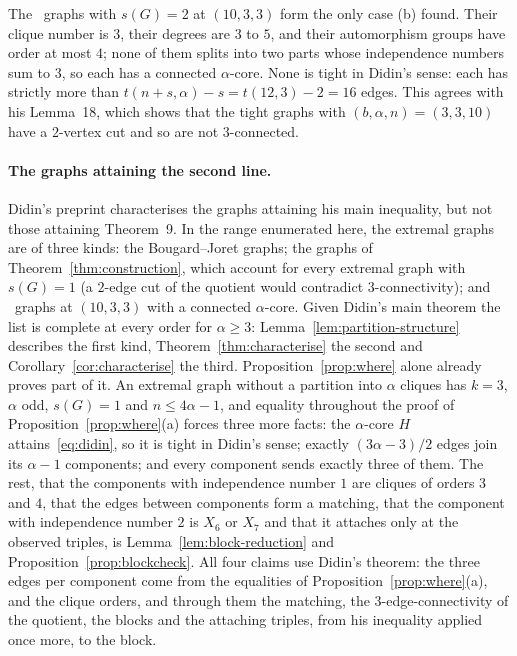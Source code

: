 \documentclass[11pt]{article}
\theoremstyle{definition}
\theoremstyle{remark}
\begin{document}
The \ntenthreeb\ graphs with $s(G)=2$ at $(10,3,3)$ form the only case (b) found. Their clique number is $3$, their
degrees are $3$ to $5$, and their automorphism groups have order at most $4$; none of them splits into two parts whose
independence numbers sum to $3$, so each has a connected $\alpha$-core. None is tight in Didin's sense: each has
strictly more than $t(n+s,\alpha)-s=t(12,3)-2=16$ edges. This agrees with his Lemma~18, which shows that the tight
graphs with $(b,\alpha,n)=(3,3,10)$ have a $2$-vertex cut and so are not $3$-connected.

\paragraph{The graphs attaining the second line.} Didin's preprint characterises the graphs attaining his main
inequality, but not those attaining Theorem~9. In the range enumerated here, the extremal graphs are of three kinds:
the Bougard--Joret graphs; the graphs of Theorem~\ref{thm:construction}, which account for every extremal graph with
$s(G)=1$ (a $2$-edge cut of the quotient would contradict $3$-connectivity); and \ntenthreeb\ graphs at $(10,3,3)$
with a connected $\alpha$-core. Given Didin's main theorem the list is complete at every order for $\alpha\ge3$: Lemma~\ref{lem:partition-structure} describes
the first kind, Theorem~\ref{thm:characterise} the second and Corollary~\ref{cor:characterise} the third.
Proposition~\ref{prop:where} alone already proves part of it. An extremal graph without a partition into
$\alpha$ cliques has $k=3$, $\alpha$ odd, $s(G)=1$ and $n\le4\alpha-1$, and equality throughout the proof of
Proposition~\ref{prop:where}(a) forces three more facts: the $\alpha$-core $H$ attains~\eqref{eq:didin}, so it is
tight in Didin's sense; exactly $(3\alpha-3)/2$ edges join its $\alpha-1$ components; and every component sends exactly
three of them. The rest, that the components with independence number $1$ are cliques of orders $3$ and $4$, that the edges
between components form a matching, that the component with independence number $2$ is $X_6$ or $X_7$ and that it
attaches only at the observed triples, is Lemma~\ref{lem:block-reduction} and Proposition~\ref{prop:blockcheck}. All
four claims use Didin's theorem: the three edges per component come from the equalities of
Proposition~\ref{prop:where}(a), and the clique orders, and through them the matching, the $3$-edge-connectivity of
the quotient, the blocks and the attaching triples, from his inequality applied once more, to the block.
\end{document}
